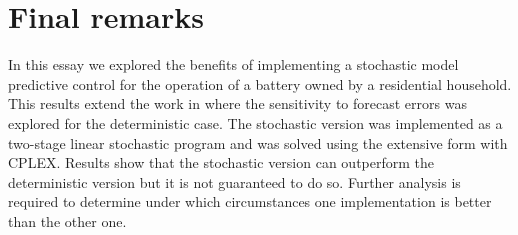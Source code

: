 \documentclass[11pt]{article}
\theoremstyle{definition}
\begin{document}
\section{Final remarks}

In this essay we explored the benefits of implementing a stochastic model predictive control for the operation of a battery owned by a residential household. This results extend the work in \cite{kiedanski} where the sensitivity to forecast errors was explored for the deterministic case. 
The stochastic version was implemented as a two-stage linear stochastic program and was solved using the extensive form with CPLEX. 
Results show that the stochastic version can outperform the deterministic version but it is not guaranteed to do so. Further analysis is required to determine under which circumstances one implementation is better than the other one.

 

\end{document}
